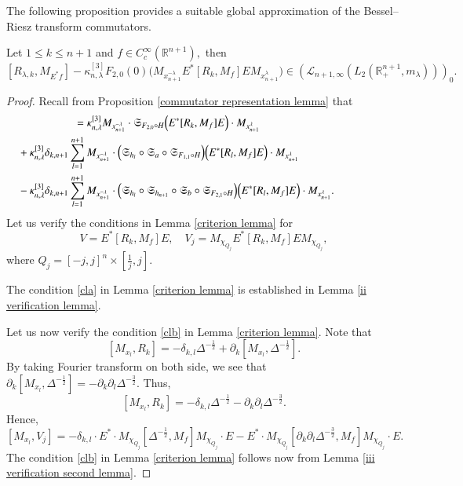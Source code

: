 \documentclass[12pt]{amsart}
\begin{document}
The following proposition provides a suitable global approximation of the Bessel--Riesz transform commutators.
\begin{proposition}\label{first approximate lemma} Let $1\leq k\leq n+1$ and $f\in C^{\infty}_c(\mathbb{R}^{n+1}),$ then
$$[R_{\lambda,k},M_{E^{\ast}f}]-\kappa_{n,\lambda}^{[3]}F_{2,0}(0)\Big( M_{x_{n+1}^{-\lambda}} E^{\ast}[R_k,M_f]E M_{x_{n+1}^{\lambda}}\Big)\in (\mathcal{L}_{n+1,\infty}(L_2(\mathbb{R}^{n+1}_+,m_{\lambda})))_0.$$
\end{proposition}
\begin{proof} Recall from Proposition \ref{commutator representation lemma} that
\begin{align*}
[R_{\lambda,k},M_{E^{\ast}f}]&=\kappa_{n,\lambda}^{[3]}M_{x_{n+1}^{-\lambda}}\cdot\mathfrak{S}_{F_{2,0}\circ H}\Big(  E^{\ast}[R_k,M_{f}]E\Big)\cdot  M_{x_{n+1}^{\lambda}}\\
&\hspace{-1.8cm}+\kappa_{n,\lambda}^{[3]}\delta_{k,n+1}\sum_{l=1}^{n+1}M_{x_{n+1}^{-\lambda}} \cdot \Big(\mathfrak{S}_{h_l}\circ\mathfrak{S}_a\circ\mathfrak{S}_{F_{1,1}\circ H}\Big)\Big(E^{\ast}[R_l,M_{f}]E \Big)\cdot M_{x_{n+1}^{\lambda}}\\
&\hspace{-1.8cm}-\kappa_{n,\lambda}^{[3]}\delta_{k,n+1}\sum_{l=1}^{n+1} M_{x_{n+1}^{-\lambda}}\cdot\Big(\mathfrak{S}_{h_l}\circ\mathfrak{S}_{h_{n+1}}\circ\mathfrak{S}_b\circ\mathfrak{S}_{F_{2,1}\circ H}\Big)\Big( E^{\ast}[R_l,M_{f}]E\Big)\cdot  M_{x_{n+1}^{\lambda}}.
\end{align*}
Let us verify the conditions in Lemma \ref{criterion lemma} for
$$V=E^{\ast}[R_k,M_f]E,\quad V_j=M_{\chi_{Q_j}}E^{\ast}[R_k,M_f]EM_{\chi_{Q_j}},$$
where $Q_j=[-j,j]^n\times[\frac1j,j].$

The condition \eqref{cla} in Lemma \ref{criterion lemma} is established in Lemma \ref{ii verification lemma}.

Let us now verify the condition \eqref{clb} in Lemma \ref{criterion lemma}. Note that
$$[M_{x_l},R_k]=-\delta_{k,l}\Delta^{-\frac12}+\partial_k[M_{x_l},\Delta^{-\frac12}].$$
By taking Fourier transform on both side, we see that $\partial_k[M_{x_l},\Delta^{-\frac12}]=-\partial_k\partial_l\Delta^{-\frac32}.$ Thus,
$$[M_{x_l},R_k]=-\delta_{k,l}\Delta^{-\frac12}-\partial_k\partial_l\Delta^{-\frac32}.$$
Hence,
$$[M_{x_l},V_j]=-\delta_{k,l}\cdot E^{\ast}\cdot M_{\chi_{Q_j}}[\Delta^{-\frac12},M_f]M_{\chi_{Q_j}}\cdot E-E^{\ast}\cdot M_{\chi_{Q_j}}[\partial_k\partial_l\Delta^{-\frac32},M_f]M_{\chi_{Q_j}}\cdot E.$$
The condition \eqref{clb} in Lemma \ref{criterion lemma} follows now from Lemma \ref{iii verification second lemma}.


\end{proof}
\end{document}
